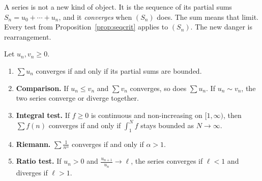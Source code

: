A series is not a new kind of object. It is the sequence of its partial sums $S_n=u_0+\cdots+u_n$, and it \emph{converges} when $(S_n)$ does. The sum means that limit. Every test from Proposition~\ref{prop:seqcrit} applies to $(S_n)$. The new danger is rearrangement.

\begin{proposition}\label{prop:posseries}
Let $u_n,v_n\ge0$.
\begin{enumerate}[label=(\alph*)]
\item $\sum u_n$ converges if and only if its partial sums are bounded.
\item \textbf{Comparison.} If $u_n\le v_n$ and $\sum v_n$ converges, so does $\sum u_n$. If $u_n\sim v_n$, the two series converge or diverge together.
\item \textbf{Integral test.} If $f\ge0$ is continuous and non-increasing on $[1,\infty)$, then $\sum f(n)$ converges if and only if $\int_1^N f$ stays bounded as $N\to\infty$.
\item \textbf{Riemann.} $\sum\frac1{n^\alpha}$ converges if and only if $\alpha>1$.
\item \textbf{Ratio test.} If $u_n>0$ and $\frac{u_{n+1}}{u_n}\to\ell$, the series converges if $\ell<1$ and diverges if $\ell>1$.
\end{enumerate}
\end{proposition}
